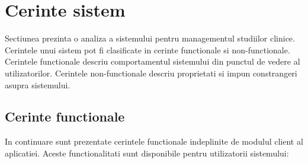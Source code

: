 \documentclass[12pt,a4paper,twoside]{report}
\begin{document}
\section{Cerinte sistem}
Sectiunea prezinta o analiza a sistemului pentru managementul studiilor clinice. Cerintele unui sistem pot fi clasificate in cerinte functionale si non-functionale. Cerintele functionale descriu comportamentul sistemului din punctul de vedere al utilizatorilor. Cerintele non-functionale descriu proprietati si impun constrangeri asupra sistemului.

\subsection{Cerinte functionale}
In continuare sunt prezentate cerintele functionale indeplinite de modulul client al aplicatiei. Aceste functionalitati sunt disponibile pentru utilizatorii sistemului:
\end{document}
